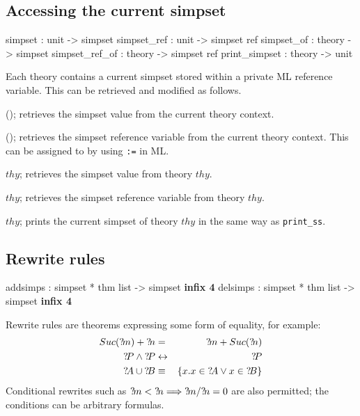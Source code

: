 \subsection{Accessing the current simpset}

\begin{ttbox}
simpset        : unit -> simpset
simpset_ref    : unit -> simpset ref
simpset_of     : theory -> simpset
simpset_ref_of : theory -> simpset ref
print_simpset  : theory -> unit
\end{ttbox}

Each theory contains a current simpset stored
within a private ML reference variable.  This can be retrieved and
modified as follows.

\begin{ttdescription}
  
\item[\ttindexbold{simpset}();] retrieves the simpset value from the
  current theory context.
  
\item[\ttindexbold{simpset_ref}();] retrieves the simpset reference
  variable from the current theory context.  This can be assigned to
  by using \texttt{:=} in ML.
  
\item[\ttindexbold{simpset_of} $thy$;] retrieves the simpset value
  from theory $thy$.
  
\item[\ttindexbold{simpset_ref_of} $thy$;] retrieves the simpset
  reference variable from theory $thy$.

\item[\ttindexbold{print_simpset} $thy$;] prints the current simpset
  of theory $thy$ in the same way as \texttt{print_ss}.

\end{ttdescription}


\subsection{Rewrite rules}
\begin{ttbox}
addsimps : simpset * thm list -> simpset \hfill{\bf infix 4}
delsimps : simpset * thm list -> simpset \hfill{\bf infix 4}
\end{ttbox}

 Rewrite rules are theorems expressing some
form of equality, for example:
\begin{eqnarray*}
  Suc(\Var{m}) + \Var{n} &=&      \Var{m} + Suc(\Var{n}) \\
  \Var{P}\conj\Var{P}    &\bimp&  \Var{P} \\
  \Var{A} \un \Var{B} &\equiv& \{x.x\in \Var{A} \disj x\in \Var{B}\}
\end{eqnarray*}
Conditional rewrites such as ${?\!m}<{?\!n} \Longrightarrow {?\!m}/{?\!n} =
0$ are also permitted; the conditions can be arbitrary formulas.

